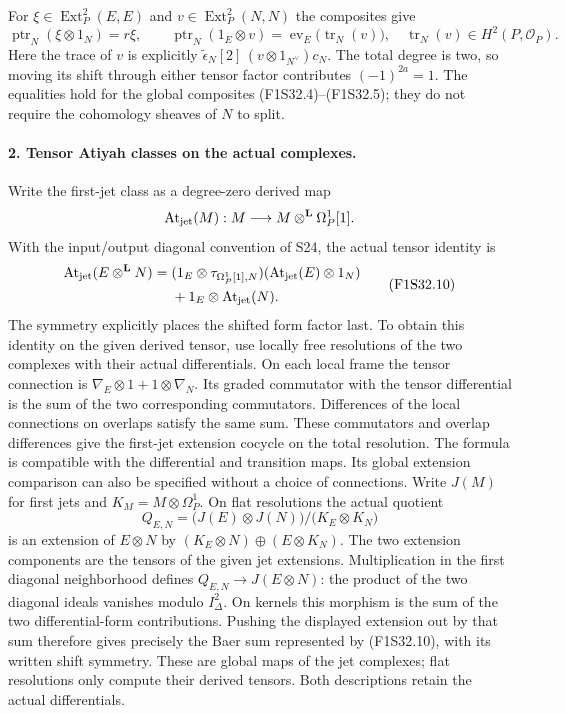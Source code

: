 For $\xi\in\operatorname{Ext}^2_P(E,E)$ and
$v\in\operatorname{Ext}^2_P(N,N)$ the composites give
\[
 \operatorname{ptr}_N(\xi\otimes1_N)=r\xi,\qquad
 \operatorname{ptr}_N(1_E\otimes v)
       =\operatorname{ev}_E\bigl(\operatorname{tr}_N(v)\bigr),
 \quad
 \operatorname{tr}_N(v)\in H^2(P,\mathcal O_P).
 \tag{F1S32.9}
\]
Here the trace of $v$ is explicitly
$\widetilde\epsilon_N[2]\,(v\otimes1_{N^\vee})c_N$.
The total degree is two, so moving its shift through
either tensor factor contributes $(-1)^{2a}=1$.
The equalities hold for the global composites
(F1S32.4)--(F1S32.5); they do not require the
cohomology sheaves of $N$ to split.

\paragraph{2. Tensor Atiyah classes on the actual complexes.}
Write the first-jet class as a degree-zero derived map
\[
 \operatorname{At}_{\rm jet}(M):
                 M\longrightarrow M\otimes^{\mathbf L}\Omega_P^1[1].
\]
With the input/output diagonal convention of S24, the
actual tensor identity is
\[
\begin{split}
 \operatorname{At}_{\rm jet}(E\otimes^{\mathbf L}N)
   ={}&(1_E\otimes\tau_{\Omega_P^1[1],N})
                 (\operatorname{At}_{\rm jet}(E)\otimes1_N)\\
      &+1_E\otimes\operatorname{At}_{\rm jet}(N).
\end{split}
 \tag{F1S32.10}
\]
The symmetry explicitly places the shifted form
factor last. To obtain this identity on the
given derived tensor, use locally free resolutions
of the two complexes with their actual differentials.
On each local frame the tensor connection is
$\nabla_E\otimes1+1\otimes\nabla_N$.
Its graded commutator with the tensor differential
is the sum of the two corresponding commutators.
Differences of the local connections on overlaps
satisfy the same sum. These commutators and
overlap differences give the first-jet extension
cocycle on the total resolution.
The formula is compatible with the differential
and transition maps. Its global extension comparison
can also be specified without a choice of connections.
Write $J(M)$ for first jets and $K_M=M\otimes\Omega_P^1$.
On flat resolutions the actual quotient
\[
 Q_{E,N}=
 \bigl(J(E)\otimes J(N)\bigr)\big/
                      \bigl(K_E\otimes K_N\bigr)
\]
is an extension of $E\otimes N$ by
$(K_E\otimes N)\oplus(E\otimes K_N)$.
The two extension components are the tensors
of the given jet extensions.
Multiplication in the first diagonal neighborhood
defines $Q_{E,N}\to J(E\otimes N)$: the product
of the two diagonal ideals vanishes modulo
$I_\Delta^2$.
On kernels this morphism is the sum of the
two differential-form contributions.
Pushing the displayed extension out by that sum
therefore gives precisely the Baer sum represented
by (F1S32.10), with its written shift symmetry.
These are global maps of the jet complexes;
flat resolutions only compute their derived tensors.
Both descriptions retain the actual differentials.

